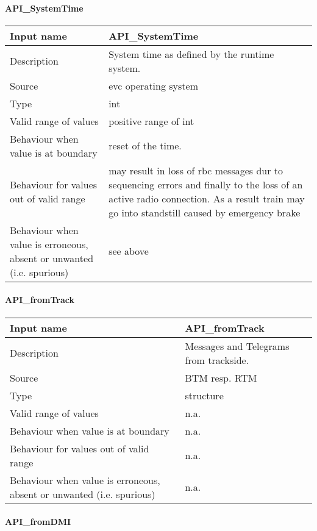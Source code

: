 \paragraph{API\_SystemTime}

\begin{longtable}{p{}p{}}
\toprule
Input name				& API\_SystemTime \\
\midrule
Description				& System time as defined by the runtime system. \\
\midrule
Source					& evc operating system  \\ 
\midrule
Type					& int \\
\midrule
Valid range of values	& positive range of int\\
\midrule
Behaviour when value is at boundary	& reset of the time. \\
\midrule
Behaviour for values out of valid range	& may result in loss of rbc messages dur to sequencing errors and finally to the loss of an active radio connection. As a result train may go into standstill caused by emergency brake \\
\midrule
Behaviour when value is erroneous, absent or unwanted (i.e. spurious) & see above \\
\bottomrule
\end{longtable}

\paragraph{API\_fromTrack}

\begin{longtable}{p{}p{}}
\toprule
Input name				& API\_fromTrack \\
\midrule
Description				& Messages and Telegrams from trackside. \\
\midrule
Source					& BTM resp. RTM\\ 
\midrule
Type					& structure \\
\midrule
Valid range of values	& n.a. \\
\midrule
Behaviour when value is at boundary	& n.a. \\
\midrule
Behaviour for values out of valid range	& n.a. \\
\midrule
Behaviour when value is erroneous, absent or unwanted (i.e. spurious) & n.a. \\
\bottomrule
\end{longtable}

\paragraph{API\_fromDMI}

